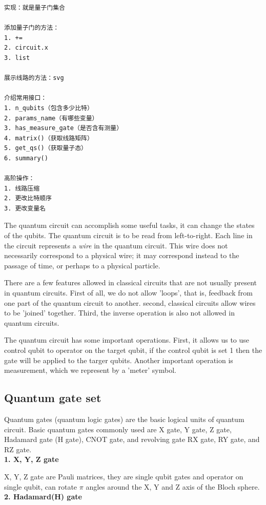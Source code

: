 \begin{lstlisting}
实现：就是量子门集合

添加量子门的方法：
1. +=
2. circuit.x
3. list

展示线路的方法：svg

介绍常用接口：
1. n_qubits（包含多少比特）
2. params_name（有哪些变量）
3. has_measure_gate（是否含有测量）
4. matrix()（获取线路矩阵）
5. get_qs()（获取量子态）
6. summary()

高阶操作：
1. 线路压缩
2. 更改比特顺序
3. 更改变量名
\end{lstlisting}

The quantum circuit can accomplish some useful tasks, it can change the states of the qubits. The quantum circuit is to be read from left-to-right. Each line in the circuit represents a \textit{wire} in the quantum circuit. This wire does not necessarily correspond to a physical wire; it may correspond instead to the passage of time, or perhaps to a physical particle.

There are a few features allowed in classical circuits that are not usually present in quantum circuits. First of all, we do not allow 'loops', that is, feedback from one part of the quantum circuit to another. second, classical circuits allow wires to be 'joined' together. Third, the inverse operation is also not allowed in quantum circuits.

The quantum circuit has some important operations. First, it allows us to use control qubit to operator on the target qubit, if the control qubit is set 1 then the gate will be applied to the targer qubits. Another important operation is measurement, which we represent by a 'meter' symbol.

\subsection{Quantum gate set}
Quantum gates (quantum logic gates) are the basic logical units of quantum circuit. Basic quantum gates commonly used are X gate, Y gate, Z gate, Hadamard gate (H gate), CNOT gate, and revolving gate RX gate, RY gate, and RZ gate. \\

\textbf{1. X, Y, Z gate}

X, Y, Z gate are Pauli matrices, they are single qubit gates and operator on single qubit, can rotate $\pi$ angles around the X, Y and Z axis of the Bloch sphere.   \\

\textbf{2. Hadamard(H) gate}

